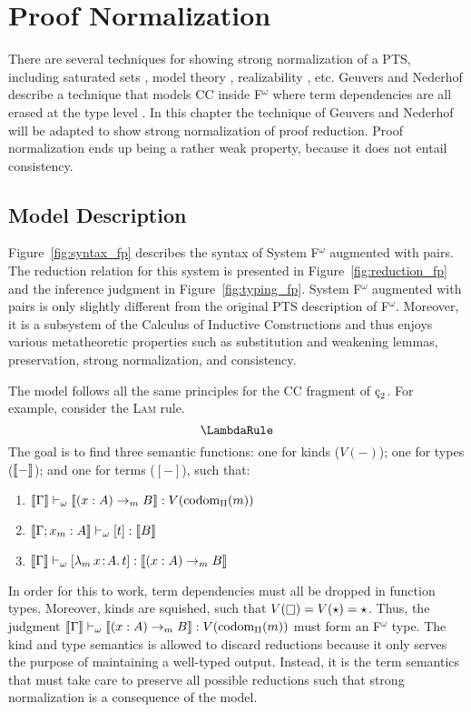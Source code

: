 \chapter{Proof Normalization}
\label{chap:3}


There are several techniques for showing strong normalization of a PTS, including saturated sets \cite{geuvers1994_sn_satset}, model theory \cite{terlouw1995_sn}, realizability \cite{ong1993}, etc.
Geuvers and Nederhof describe a technique that models CC inside F$^\omega$ where term dependencies are all erased at the type level \cite{geuvers1991_sn_tof}.
In this chapter the technique of Geuvers and Nederhof will be adapted to show strong normalization of proof reduction.
Proof normalization ends up being a rather weak property, because it does not entail consistency.

\section{Model Description}

Figure~\ref{fig:syntax_fp} describes the syntax of System F$^\omega$ augmented with pairs.
The reduction relation for this system is presented in Figure~\ref{fig:reduction_fp} and the inference judgment in Figure~\ref{fig:typing_fp}.
System F$^\omega$ augmented with pairs is only slightly different from the original PTS description of F$^\omega$.
Moreover, it is a subsystem of the Calculus of Inductive Constructions and thus enjoys various metatheoretic properties such as substitution and weakening lemmas, preservation, strong normalization, and consistency.





The model follows all the same principles for the CC fragment of $\ced$.
For example, consider the \textsc{Lam} rule.
$$\LambdaRule$$
The goal is to find three semantic functions: one for kinds ($V(-)$); one for types ($\llbracket - \rrbracket$); and one for terms ($[-]$), such that:
    \begin{enumerate}
        \item $\llbracket \Gamma \rrbracket \vdash_\omega \llbracket (x : A) \to_m B \rrbracket : V(\textnormal{codom}_\Pi(m))$
        \item $\llbracket \Gamma; x_m : A \rrbracket \vdash_\omega [t] : \llbracket B \rrbracket$
        \item $\llbracket \Gamma \rrbracket \vdash_\omega [{\lambda_m}\, x\! : \! A.\, t] : \llbracket (x : A) \to_m B \rrbracket$
    \end{enumerate}
In order for this to work, term dependencies must all be dropped in function types.
Moreover, kinds are squished, such that $V(\kind) = V(\star) = \star$.
Thus, the judgment $\llbracket \Gamma \rrbracket \vdash_\omega \llbracket (x : A) \to_m B \rrbracket : V(\textnormal{codom}_\Pi(m))$ must form an F$^\omega$ type.
The kind and type semantics is allowed to discard reductions because it only serves the purpose of maintaining a well-typed output.
Instead, it is the term semantics that must take care to preserve all possible reductions such that strong normalization is a consequence of the model.

